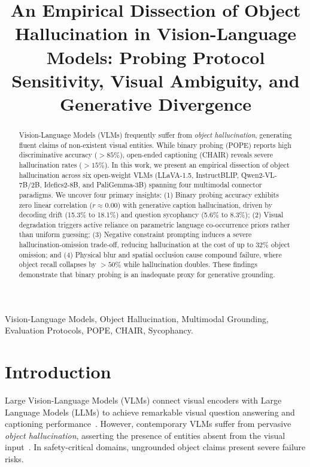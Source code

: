 \documentclass[conference]{IEEEtran}
\begin{document}
\title{An Empirical Dissection of Object Hallucination in Vision-Language Models: Probing Protocol Sensitivity, Visual Ambiguity, and Generative Divergence}

\author{
}

\maketitle

\begin{abstract}
Vision-Language Models (VLMs) frequently suffer from \textit{object hallucination}, generating fluent claims of non-existent visual entities. While binary probing (POPE) reports high discriminative accuracy ($>85\%$), open-ended captioning (CHAIR) reveals severe hallucination rates ($>15\%$). In this work, we present an empirical dissection of object hallucination across six open-weight VLMs (LLaVA-1.5, InstructBLIP, Qwen2-VL-7B/2B, Idefics2-8B, and PaliGemma-3B) spanning four multimodal connector paradigms. We uncover four primary insights: (1) Binary probing accuracy exhibits zero linear correlation ($r \approx 0.00$) with generative caption hallucination, driven by decoding drift (15.3\% to 18.1\%) and question sycophancy (5.6\% to 8.3\%); (2) Visual degradation triggers active reliance on parametric language co-occurrence priors rather than uniform guessing; (3) Negative constraint prompting induces a severe hallucination-omission trade-off, reducing hallucination at the cost of up to $32\%$ object omission; and (4) Physical blur and spatial occlusion cause compound failure, where object recall collapses by $>50\%$ while hallucination doubles. These findings demonstrate that binary probing is an inadequate proxy for generative grounding.
\end{abstract}

\begin{IEEEkeywords}
Vision-Language Models, Object Hallucination, Multimodal Grounding, Evaluation Protocols, POPE, CHAIR, Sycophancy.
\end{IEEEkeywords}

\section{Introduction}
Large Vision-Language Models (VLMs) connect visual encoders with Large Language Models (LLMs) to achieve remarkable visual question answering and captioning performance~\cite{radford2021learning, liu2023llava, dai2023instructblip, wang2024qwen2vl, laurencon2024obelics}. However, contemporary VLMs suffer from pervasive \textit{object hallucination}, asserting the presence of entities absent from the visual input~\cite{rohrbach2018chair, li2023evaluating}. In safety-critical domains, ungrounded object claims present severe failure risks.
\end{document}
